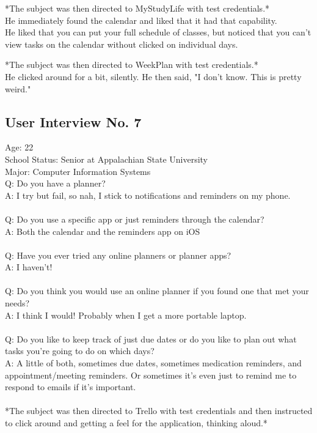 *The subject was then directed to MyStudyLife with test credentials.*\\
He immediately found the calendar and liked that it had that capability.\\
He liked that you can put your full schedule of classes, but noticed that you can't view tasks on the calendar without clicked on individual days.

*The subject was then directed to WeekPlan with test credentials.*\\
He clicked around for a bit, silently. He then said, "I don't know. This is pretty weird."

\subsection{User Interview No. 7}
Age: 22\\
School Status: Senior at Appalachian State University\\
Major: Computer Information Systems
\\
Q: Do you have a planner?\\
A: I try but fail, so nah, I stick to notifications and reminders on my phone.\\ \\
Q: Do you use a specific app or just reminders through the calendar?\\
A: Both the calendar and the reminders app on iOS\\ \\
Q: Have you ever tried any online planners or planner apps?\\
A: I haven’t!\\ \\
Q: Do you think you would use an online planner if you found one that met your needs?\\
A: I think I would! Probably when I get a more portable laptop.\\ \\
Q: Do you like to keep track of just due dates or do you like to plan out what tasks you’re going to do on which days?\\
A: A little of both, sometimes due dates, sometimes medication reminders, and appointment/meeting reminders. Or sometimes it’s even just to remind me to respond to emails if it’s important.\\ \\

*The subject was then directed to Trello with test credentials and then instructed to click around and getting a feel for the application, thinking aloud.*\\

